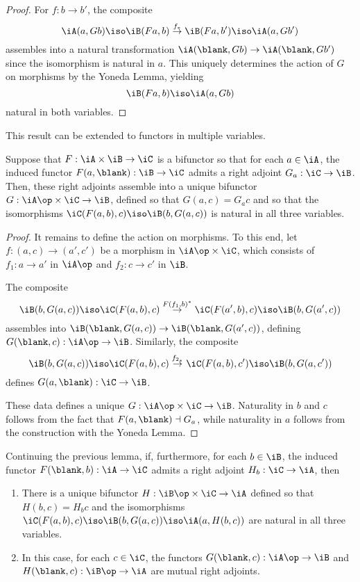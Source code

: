\documentclass{amsart}
\begin{document}
\begin{proof}
  For $f : b \to b'$, the composite
  \[
    \iA(a, Gb) \iso \iB(Fa, b) \overset{f_{*}}{\to} \iB(Fa, b') \iso \iA(a, Gb')
  \]
  assembles into a natural transformation $\iA(\blank, Gb) \to \iA(\blank, Gb')$ since the isomorphism is natural in $a$.
  This uniquely determines the action of $G$ on morphisms by the Yoneda Lemma, yielding
  \[
    \iB(Fa, b) \iso \iA(a, Gb)
  \]
  natural in both variables.
\end{proof}

This result can be extended to functors in multiple variables.

\begin{lem}
  Suppose that $F : \iA \times \iB \to \iC$ is a bifunctor so that for each $a \in \iA$, the induced functor $F(a, \blank) : \iB \to \iC$ admits a right adjoint $G_{a} : \iC \to \iB$.
  Then, these right adjoints assemble into a unique bifunctor $G : \iA\op \times \iC \to \iB$, defined so that $G(a,c) = G_{a}c$ and so that the isomorphisms $\iC(F(a,b),c) \iso \iB(b, G(a,c))$ is natural in all three variables.
\end{lem}
\begin{proof}
  It remains to define the action on morphisms.
  To this end, let $f : (a, c) \to (a', c')$ be a morphism in $\iA\op \times \iC$, which consists of $f_{1} : a \to a'$ in $\iA\op$ and $f_{2} : c \to c'$ in $\iB$.

  The composite
  \[
    \iB(b, G(a,c)) \iso \iC(F(a,b),c) \overset{F(f_{1},b)^{*}}{\to} \iC(F(a',b),c) \iso \iB(b, G(a',c))
  \]
  assembles into $\iB(\blank, G(a,c)) \to \iB(\blank, G(a', c))$, defining $G(\blank, c) : \iA\op \to \iB$.
  Similarly, the composite
  \[
    \iB(b, G(a,c)) \iso \iC(F(a,b), c) \overset{f_{2_{*}}}{\to} \iC(F(a,b), c') \iso \iB(b, G(a,c'))
  \]
  defines $G(a, \blank) : \iC \to \iB$.

  These data defines a unique $G : \iA\op \times \iC \to \iB$.
  Naturality in $b$ and $c$ follows from the fact that $F(a, \blank) \dashv G_{a}$, while naturality in $a$ follows from the construction with the Yoneda Lemma.
\end{proof}

\begin{lem}
  Continuing the previous lemma, if, furthermore, for each $b \in \iB$, the induced functor $F(\blank, b) : \iA \to \iC$ admits a right adjoint $H_{b} : \iC \to \iA$, then
  \begin{enumerate}
  \item There is a unique bifunctor $H : \iB\op \times \iC \to \iA$ defined so that $H(b, c) = H_{b}c$ and the isomorphisms $\iC(F(a,b),c) \iso \iB(b, G(a,c)) \iso \iA(a, H(b,c))$ are natural in all three variables.
  \item In this case, for each $c \in \iC$, the functors $G(\blank, c) : \iA\op \to \iB$ and $H(\blank, c) : \iB\op \to \iA$ are mutual right adjoints.
  \end{enumerate}
\end{lem}
\end{document}
